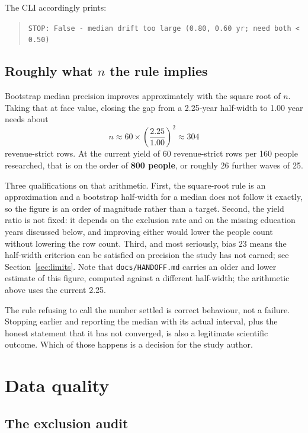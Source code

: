 \documentclass[11pt]{article}
\begin{document}
The CLI accordingly prints:

\begin{quote}
\texttt{STOP: False - median drift too large (0.80, 0.60 yr; need both < 0.50)}
\end{quote}

\subsection{Roughly what $n$ the rule implies}

Bootstrap median precision improves approximately with the square root of $n$.
Taking that at face value, closing the gap from a 2.25-year half-width to 1.00
year needs about
\[
n \approx 60 \times \left(\frac{2.25}{1.00}\right)^{2} \approx 304
\]
revenue-strict rows. At the current yield of 60 revenue-strict rows per 160
people researched, that is on the order of \textbf{800 people}, or roughly 26
further waves of 25.

Three qualifications on that arithmetic. First, the square-root rule is an
approximation and a bootstrap half-width for a median does not follow it
exactly, so the figure is an order of magnitude rather than a target. Second,
the yield ratio is not fixed: it depends on the exclusion rate and on the
missing education years discussed below, and improving either would lower the
people count without lowering the row count. Third, and most seriously, bias 23
means the half-width criterion can be satisfied on precision the study has not
earned; see Section~\ref{sec:limits}. Note that
\texttt{docs/HANDOFF.md} carries an older and lower estimate of this figure,
computed against a different half-width; the arithmetic above uses the current
2.25.

The rule refusing to call the number settled is correct behaviour, not a
failure. Stopping earlier and reporting the median with its actual interval,
plus the honest statement that it has not converged, is also a legitimate
scientific outcome. Which of those happens is a decision for the study author.

\section{Data quality}
\label{sec:quality}

\subsection{The exclusion audit}
\end{document}

